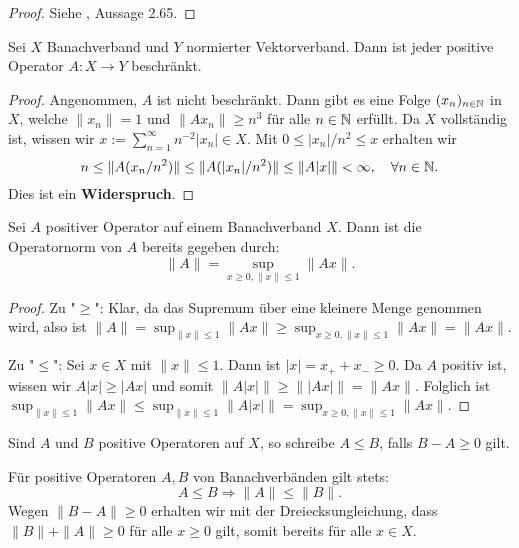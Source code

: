 \begin{proof}
Siehe \cite{banasiak_arlotti_2006}, Aussage 2.65.
\end{proof}


\begin{satz}
Sei $X$ Banachverband und  $Y$ normierter Vektorverband. Dann ist jeder positive Operator $A\colon X\to Y$ beschränkt.
\end{satz}

\begin{proof}
Angenommen, $A$ ist nicht beschränkt. Dann gibt es eine Folge $(x_n)_{n\in\mathbb{N}}$ in $X$, welche $\|x_n\|=1$ und $\|Ax_n\|\geq n^3$ für alle $n\in\mathbb{N}$ erfüllt. Da $X$ vollständig ist, wissen wir  $x:=\sum_{n=1}^\infty n^{-2}|x_n|\in X$. Mit $0\leq |x_n|/n^2\leq x$ erhalten wir 
\begin{equation*}
n \leq \|A(x_n/n^2)\| \leq \|A(|x_n|/n^{2})\|\leq \|A|x|\|<\infty,\quad\forall n\in\mathbb{N}.
\end{equation*}
Dies ist ein  \textbf{Widerspruch}.
\end{proof}

\begin{prop}\label{Norm positiver Operatoren}
Sei $A$ positiver Operator auf einem Banachverband $X$. Dann ist die Operatornorm von $A$ bereits gegeben durch:
\begin{equation*}
\|A\|=\sup_{x\geq 0, \| x \| \leq 1} \|Ax\|.
\end{equation*}
\end{prop}

\begin{proof}
Zu "$\geq$": Klar, da das Supremum über eine kleinere Menge genommen wird, also ist $\| A\| = \sup_{\|x\|\leq 1}\|Ax\|\geq\sup_{x\geq 0,\|x\|\leq 1}\|Ax\| = \|Ax\|$.

\par 
Zu "$\leq$": Sei $x\in X$ mit $\|x\|\leq 1$. Dann ist $|x| = x_+ + x_-\geq0$. Da $A$ positiv ist, wissen wir $A|x|\geq |Ax|$ und somit $\|A|x|\|\geq \||Ax|\|=\|Ax\|$. Folglich ist $\sup_{\|x\|\leq 1}\|Ax\|\leq\sup_{\|x\|\leq 1}\|A|x|\|=\sup_{x\geq 0,\|x\|\leq 1}\|Ax\|$.
\end{proof}

\begin{bem}
Sind $A$ und $B$ positive Operatoren auf $X$, so schreibe $A\leq B$, falls $B-A\geq0$ gilt.
\end{bem}

\begin{bem}
Für positive Operatoren $A, B$ von Banachverbänden gilt stets:
\begin{equation*}
A\leq B\Rightarrow \|A\|\leq \|B\|. 
\end{equation*}
Wegen $\|B-A\|\geq0$ erhalten wir mit der Dreiecksungleichung, dass $\|B\| + \|A\| \geq 0$ für alle $x\geq0$ gilt, somit bereits für alle $x\in X$.
\end{bem}

